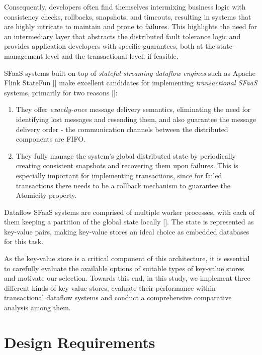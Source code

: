 Consequently, developers often find themselves intermixing business logic with consistency checks, rollbacks, snapshots, and timeouts, resulting in systems that are highly intricate to maintain and prone to failures. This highlights the need for an intermediary layer that abstracts the distributed fault tolerance logic and provides application developers with specific guarantees, both at the state-management level and the transactional level, if feasible.

SFaaS systems built on top of \textit{stateful streaming dataflow engines} such as Apache Flink StateFun [\cite{apache-flink}] make excellent candidates for implementing \textit{transactional SFaaS} systems, primarily for two reasons [\cite{transactions-serverless-functions-leveraging-stateful-dataflows}]:

\begin{enumerate}
    \item They offer \textit{exactly-once} message delivery semantics, eliminating the need for identifying lost messages and resending them, and also guarantee the message delivery order - the communication channels between the distributed components are FIFO.

    \item They fully manage the system's global distributed state by periodically creating consistent snapshots and recovering them upon failures. This is especially important for implementing transactions, since for failed transactions there needs to be a rollback mechanism to guarantee the Atomicity property.
\end{enumerate}

Dataflow SFaaS systems are comprised of multiple worker processes, with each of them keeping a partition of the global state locally [\cite{apache-flink}]. The state is represented as key-value pairs, making key-value stores an ideal choice as embedded databases for this task.

As the key-value store is a critical component of this architecture, it is essential to carefully evaluate the available options of suitable types of key-value stores and motivate our selection. Towards this end, in this study, we implement three different kinds of key-value stores, evaluate their performance within transactional dataflow systems and conduct a comprehensive comparative analysis among them.

\section{Design Requirements}
\label{design-requirements}

